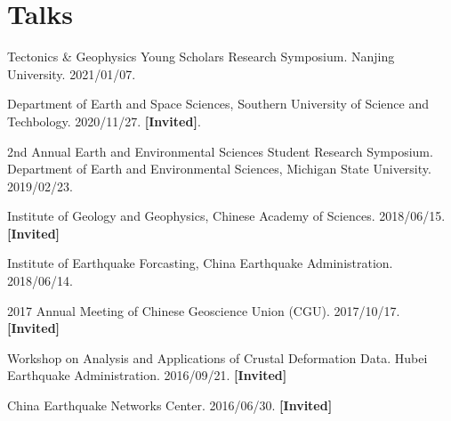 \section{Talks}

\newcommand{\Invited}{\textbf{[Invited]}}

\begin{etaremune}
\item
	Tectonics \& Geophysics Young Scholars Research Symposium.
	Nanjing University.
	2021/01/07.
\item
	Department of Earth and Space Sciences, Southern University of Science and Techbology.
	2020/11/27.
	\Invited.
\item
    2nd Annual Earth and Environmental Sciences Student Research Symposium.
    Department of Earth and Environmental Sciences, Michigan State University.
    2019/02/23.
\item
    Institute of Geology and Geophysics, Chinese Academy of Sciences.
    2018/06/15.
    \Invited
\item
    Institute of Earthquake Forcasting, China Earthquake Administration.
    2018/06/14.
\item
    2017 Annual Meeting of Chinese Geoscience Union (CGU).
    2017/10/17.
    \Invited
\item
    Workshop on Analysis and Applications of Crustal Deformation Data.
    Hubei Earthquake Administration.
    2016/09/21.
    \Invited
\item
    China Earthquake Networks Center.
    2016/06/30.
    \Invited
\end{etaremune}
